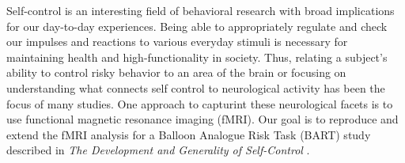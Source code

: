 \par Self-control is an interesting field of behavioral research with broad 
implications for our day-to-day experiences. Being able to appropriately 
regulate and check our impulses and reactions to various everyday stimuli 
is necessary for maintaining health and high-functionality in society. 
Thus, relating a subject’s ability to control risky behavior to an area 
of the brain or focusing on understanding what connects self control to 
neurological activity has been the focus of many studies. One approach to 
capturint these neurological facets is to use functional magnetic resonance 
imaging (fMRI). Our goal is to reproduce and extend the fMRI analysis for a 
Balloon Analogue Risk Task (BART) study described in \textit{The Development 
and Generality of Self-Control} \cite{CohenSelfControl}.

